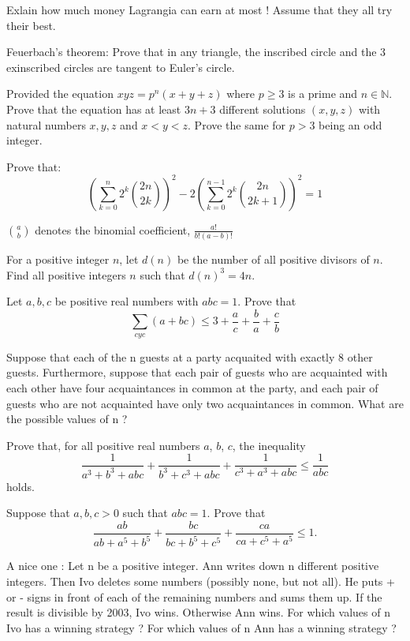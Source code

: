 Exlain how much money Lagrangia can earn at most ! Assume that they all try their best.
\eq

\bq{}{}
Feuerbach's theorem:
Prove that in any triangle, the inscribed circle and the 3 exinscribed circles are tangent to Euler's circle.
\eq

Provided the equation $xyz = p^n(x + y + z)$ where $p \geq 3$ is a prime and $n \in \mathbb{N}$. Prove that the equation has at least $3n + 3$ different solutions $(x,y,z)$ with natural numbers $x,y,z$ and $x < y < z$. Prove the same for $p > 3$ being an odd integer.
\eq

\bq{}{}
Prove that: \[ \left(\sum_{k=0}^{n} 2^k \binom{2n}{2k}\right)^2 - 2 \left(\sum_{k=0}^{n-1} 2^k \binom{2n}{2k+1}\right)^2=1 \]

$\binom{a}{b}$ denotes the binomial coefficient, $\frac{a!}{b!(a-b)!}$
\eq

For a positive integer $n$, let $d(n)$ be the number of all positive divisors of $n$. Find all positive integers $n$ such that $d(n)^3=4n$.
\eq

\bq{}{}
Let $a, b, c$ be positive real numbers with $abc = 1$. Prove that
\[\sum_{cyc} (a+ bc) \leq 3 + \frac{a}c+\frac{b}a+\frac{c}b\]
\eq

\bq{}{}
Suppose that each of the n guests at a party acquaited with exactly 8 other guests. Furthermore, suppose that each pair of guests who are acquainted with each other have four acquaintances in common at the party, and each pair of guests who are not acquainted have only two acquaintances in common. What are the possible values of n ?
\eq

Prove that, for all positive real numbers $ a$, $ b$, $ c$, the inequality
\[ \frac {1}{a^3 + b^3 + abc} + \frac {1}{b^3 + c^3 + abc} + \frac {1}{c^3 + a^3 + abc} \leq \frac {1}{abc} \]
holds.
\eq

Suppose that $a, b, c > 0$ such that $abc = 1$. Prove that \[ \frac{ab}{ab + a^5 + b^5} + \frac{bc}{bc + b^5 + c^5} + \frac{ca}{ca + c^5 + a^5} \leq 1. \]
\eq

\bq{}{}
A nice one :
Let n be a positive integer. Ann writes down n different positive integers. Then Ivo deletes some numbers (possibly none, but not all). He puts + or - signs in front of each of the remaining numbers and sums them up. If the result is divisible by 2003, Ivo wins. Otherwise Ann wins. For which values of n Ivo has a winning strategy ? For which values of n Ann has a winning strategy ?
\eq


